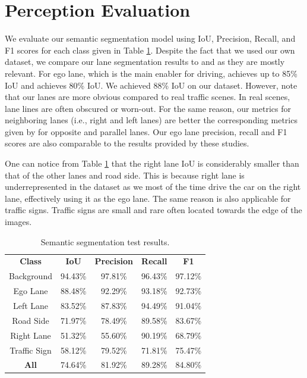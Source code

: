 \section{Perception Evaluation}

We evaluate our semantic segmentation model using IoU, Precision, Recall, and
F1 scores for each class given in Table
\ref{table:semantic-segmentation-test-results}. Despite the fact that we used
our own dataset, we compare our lane segmentation results to
\cite{Barnes2016FindYO} and  \cite{Meyer2018DeepSL} as they are mostly
relevant. For ego lane, which is the main enabler for driving,
\cite{Barnes2016FindYO} achieves up to 85\% IoU and \cite{Meyer2018DeepSL}
achieves 80\% IoU. We achieved 88\% IoU on our dataset. However, note that our
lanes are more obvious compared to real traffic scenes. In real scenes, lane
lines are often obscured or worn-out. For the same reason, our metrics for
neighboring lanes (i.e., right and left lanes) are better the corresponding
metrics given by \cite{Meyer2018DeepSL} for opposite and parallel lanes. Our
ego lane precision, recall and F1 scores are also comparable to the results
provided by these studies.

One can notice from Table \ref{table:semantic-segmentation-test-results} that
the right lane IoU is considerably smaller than that of the other lanes and
road side. This is because right lane is underrepresented in the dataset as we
most of the time drive the car on the right lane, effectively using it as the
ego lane. The same reason is also applicable for traffic signs. Traffic signs
are small and rare often located towards the edge of the images.

\begin{table}[h]
  \begin{center}
    \caption[Semantic segmentation test results]{Semantic segmentation
      test results.}
    \label{table:semantic-segmentation-test-results}
    \begin{tabular}{|c|c|c|c|c|}
      \hline
      \textbf{Class} & \textbf{IoU} & \textbf{Precision} & \textbf{Recall} & \textbf{F1}  \\
      Background     & 94.43\%      & 97.81\%            & 96.43\%         & 97.12\%      \\
      Ego Lane       & 88.48\%      & 92.29\%            & 93.18\%         & 92.73\%      \\
      Left Lane      & 83.52\%      & 87.83\%            & 94.49\%         & 91.04\%      \\
      Road Side      & 71.97\%      & 78.49\%            & 89.58\%         & 83.67\%      \\
      Right Lane     & 51.32\%      & 55.60\%            & 90.19\%         & 68.79\%      \\
      Traffic Sign   & 58.12\%      & 79.52\%            & 71.81\%         & 75.47\%      \\
      \hline
      \textbf{All}   & 74.64\%      & 81.92\%            & 89.28\%         & 84.80\%      \\
      \hline
    \end{tabular}
  \end{center}
\end{table}


